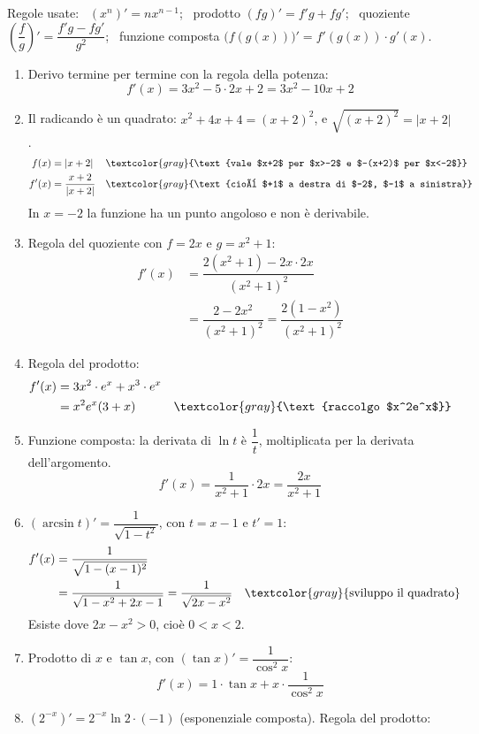 \begin{question}[ID=1.1, subtitle={Calcolo di derivate — serie 1}, tags={derivate, calcolo}, difficulty=media]
\begin{explanation}
Regole usate: \ $(x^n)'=nx^{n-1}$; \ prodotto $(fg)'=f'g+fg'$; \ quoziente $\left(\dfrac fg\right)'=\dfrac{f'g-fg'}{g^2}$; \ funzione composta $\big(f(g(x))\big)'=f'(g(x))\cdot g'(x)$.
\begin{enumerate}[label=\arabic*)]
    \item Derivo termine per termine con la regola della potenza:
    \[ f'(x)=3x^2-5\cdot2x+2=3x^2-10x+2 \]
    \item Il radicando è un quadrato: $x^2+4x+4=(x+2)^2$, e $\sqrt{(x+2)^2}=|x+2|$.
    \[\begin{aligned}
    f(x) &= |x+2| && \textcolor{gray}{\text{vale $x+2$ per $x>-2$ e $-(x+2)$ per $x<-2$}}\\
    f'(x) &= \dfrac{x+2}{|x+2|} && \textcolor{gray}{\text{cioè $+1$ a destra di $-2$, $-1$ a sinistra}}
    \end{aligned}\]
    In $x=-2$ la funzione ha un punto angoloso e non è derivabile.
    \item Regola del quoziente con $f=2x$ e $g=x^2+1$:
    \[\begin{aligned}
    f'(x) &= \dfrac{2(x^2+1)-2x\cdot2x}{(x^2+1)^2}\\
    &= \dfrac{2-2x^2}{(x^2+1)^2}=\dfrac{2(1-x^2)}{(x^2+1)^2}
    \end{aligned}\]
    \item Regola del prodotto:
    \[\begin{aligned}
    f'(x) &= 3x^2\cdot e^x+x^3\cdot e^x\\
    &= x^2e^x(3+x) && \textcolor{gray}{\text{raccolgo $x^2e^x$}}
    \end{aligned}\]
    \item Funzione composta: la derivata di $\ln t$ è $\dfrac1t$, moltiplicata per la derivata dell'argomento.
    \[ f'(x)=\dfrac{1}{x^2+1}\cdot2x=\dfrac{2x}{x^2+1} \]
    \item $(\arcsin t)'=\dfrac{1}{\sqrt{1-t^2}}$, con $t=x-1$ e $t'=1$:
    \[\begin{aligned}
    f'(x) &= \dfrac{1}{\sqrt{1-(x-1)^2}}\\
    &= \dfrac{1}{\sqrt{1-x^2+2x-1}}=\dfrac{1}{\sqrt{2x-x^2}} && \textcolor{gray}{\text{sviluppo il quadrato}}
    \end{aligned}\]
    Esiste dove $2x-x^2>0$, cioè $0<x<2$.
    \item Prodotto di $x$ e $\tan x$, con $(\tan x)'=\dfrac{1}{\cos^2x}$:
    \[ f'(x)=1\cdot\tan x+x\cdot\dfrac{1}{\cos^2x} \]
    \item $(2^{-x})'=2^{-x}\ln2\cdot(-1)$ (esponenziale composta). Regola del prodotto:

\end{enumerate}
\end{explanation}
\end{question}

